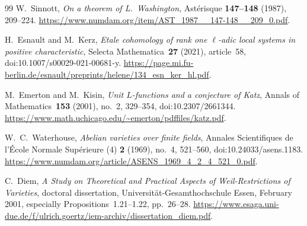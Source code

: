 \documentclass[11pt,a4paper]{article}
\begin{document}
\begin{thebibliography}{99}
W.~Sinnott,
\emph{On a theorem of L.~Washington},
Ast\'erisque \textbf{147--148} (1987), 209--224.
\url{https://www.numdam.org/item/AST_1987__147-148__209_0.pdf}.

H.~Esnault and M.~Kerz,
\emph{Etale cohomology of rank one $\ell$-adic local systems in positive characteristic},
Selecta Mathematica~\textbf{27} (2021), article~58,
doi:10.1007/s00029-021-00681-y.
\url{https://page.mi.fu-berlin.de/esnault/preprints/helene/134_esn_ker_hl.pdf}.

M.~Emerton and M.~Kisin,
\emph{Unit $L$-functions and a conjecture of Katz},
Annals of Mathematics~\textbf{153} (2001), no.~2, 329--354,
doi:10.2307/2661344.
\url{https://www.math.uchicago.edu/~emerton/pdffiles/katz.pdf}.

W.~C.~Waterhouse,
\emph{Abelian varieties over finite fields},
Annales Scientifiques de l'\'Ecole Normale Sup\'erieure (4)
\textbf{2} (1969), no.~4, 521--560,
doi:10.24033/asens.1183.
\url{https://www.numdam.org/article/ASENS_1969_4_2_4_521_0.pdf}.

C.~Diem,
\emph{A Study on Theoretical and Practical Aspects of Weil-Restrictions
of Varieties}, doctoral dissertation, Universit\"at-Gesamthochschule
Essen, February 2001, especially Propositions~1.21--1.22, pp.~26--28.
\url{https://www.esaga.uni-due.de/f/ulrich.goertz/iem-archiv/dissertation_diem.pdf}.

\end{thebibliography}
\end{document}
